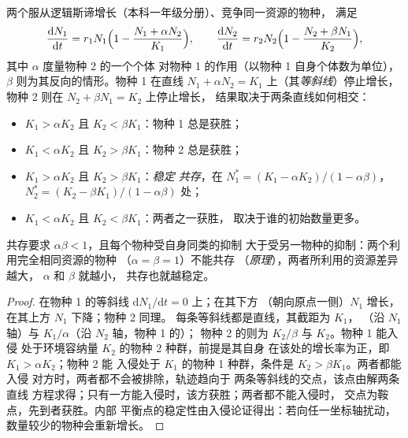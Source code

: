 \begin{theorem}\label{thm:b2:speciation:lv}
两个服从逻辑斯谛增长（本科一年级分册）、竞争同一资源的物种，
满足
\[
\frac{\mathrm{d}N_1}{\mathrm{d}t} = r_1 N_1\Bigl(1 - \frac{N_1 + \alpha N_2}{K_1}\Bigr), \qquad
\frac{\mathrm{d}N_2}{\mathrm{d}t} = r_2 N_2\Bigl(1 - \frac{N_2 + \beta N_1}{K_2}\Bigr),
\]
其中 $\alpha$ 度量物种 2 的一个个体
对物种 1 的作用（以物种 1 自身个体数为单位），$\beta$
则为其反向的情形。物种 1 在直线 $N_1 + \alpha N_2 =
K_1$ 上（其\emph{等斜线}）停止增长，物种 2 则在 $N_2 + \beta N_1 = K_2$ 上停止增长，
结果取决于两条直线如何相交：
\begin{itemize}
  \item $K_1 > \alpha K_2$ 且 $K_2 < \beta K_1$：物种 1
        总是获胜；
  \item $K_1 < \alpha K_2$ 且 $K_2 > \beta K_1$：物种 2
        总是获胜；
  \item $K_1 > \alpha K_2$ 且 $K_2 > \beta K_1$：\emph{稳定
        共存}，在 $N_1^{*} = (K_1 - \alpha K_2)/(1 - \alpha\beta)$，
        $N_2^{*} = (K_2 - \beta K_1)/(1 - \alpha\beta)$ 处；
  \item $K_1 < \alpha K_2$ 且 $K_2 < \beta K_1$：两者之一获胜，
        取决于谁的初始数量更多。
\end{itemize}
共存要求 $\alpha\beta < 1$，且每个物种受自身同类的抑制
大于受另一物种的抑制：两个利用完全相同资源的物种
（$\alpha = \beta = 1$）不能共存
（\emph{原理}），两者所利用的资源差异越大，
$\alpha$ 和 $\beta$ 就越小，
共存也就越稳定。
\end{theorem}
\begin{proof}
在物种 1 的等斜线 $\mathrm{d}N_1/\mathrm{d}t = 0$ 上；在其下方
（朝向原点一侧）$N_1$ 增长，在其上方 $N_1$ 下降；物种 2 同理。
每条等斜线都是直线，其截距为 $K_1$，
（沿 $N_1$ 轴）与 $K_1/\alpha$（沿 $N_2$ 轴，物种 1 的）；
物种 2 的则为 $K_2/\beta$ 与 $K_2$。物种 1 能入侵
处于环境容纳量 $K_2$ 的物种 2 种群，前提是其自身
在该处的增长率为正，即 $K_1 > \alpha K_2$；物种 2 能
入侵处于 $K_1$ 的物种 1 种群，条件是 $K_2 > \beta K_1$。两者都能入侵
对方时，两者都不会被排除，轨迹趋向于
两条等斜线的交点，该点由解两条直线
方程求得；只有一方能入侵时，该方获胜；两者都不能入侵时，
交点为鞍点，先到者获胜。内部
平衡点的稳定性由入侵论证得出：若向任一坐标轴扰动，
数量较少的物种会重新增长。
\end{proof}

